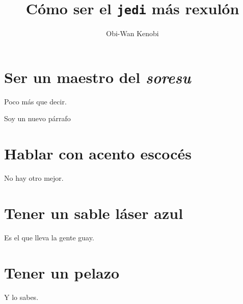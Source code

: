 \documentclass[12pt]{article}
\title{Cómo ser el \texttt{jedi} más rexulón}
\author{Obi-Wan Kenobi}
\newcommand{\newpar} {
    \vskip 1cm
}
\begin{document}
    \maketitle

    \newpage
    \tableofcontents
    \newpage

    \section{Ser un maestro del \textit{soresu}}
        Poco más que decir.

        \newpar

        Soy un nuevo párrafo

    \section{Hablar con acento escocés}
        No hay otro mejor.

    \section{Tener un sable láser azul}
        Es el que lleva la gente guay.

    \section{Tener un pelazo}
        Y lo sabes.
\end{document}
